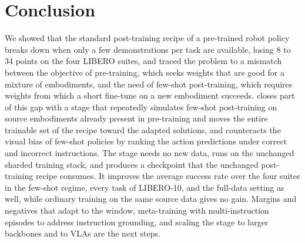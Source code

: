 \section{Conclusion}
\label{sec:conclusion}

We showed that the standard post-training recipe of a pre-trained robot policy breaks down when only a few demonstrations per task are available, losing 8 to 34 points on the four LIBERO suites, and traced the problem to a mismatch between the objective of pre-training, which seeks weights that are good for a mixture of embodiments, and the need of few-shot post-training, which requires weights from which a short fine-tune on a new embodiment succeeds.
\Method closes part of this gap with a stage that repeatedly simulates few-shot post-training on source embodiments already present in pre-training and moves the entire trainable set of the recipe toward the adapted solutions, and \Rpl counteracts the visual bias of few-shot policies by ranking the action predictions under correct and incorrect instructions.
The stage needs no new data, runs on the unchanged sharded training stack, and produces a checkpoint that the unchanged post-training recipe consumes.
It improves the average success rate over the four suites in the few-shot regime, every task of LIBERO-10, and the full-data setting as well, while ordinary training on the same source data gives no gain.
Margins and negatives that adapt to the window, meta-training with multi-instruction episodes to address instruction grounding, and scaling the stage to larger backbones and to VLAs are the next steps.
